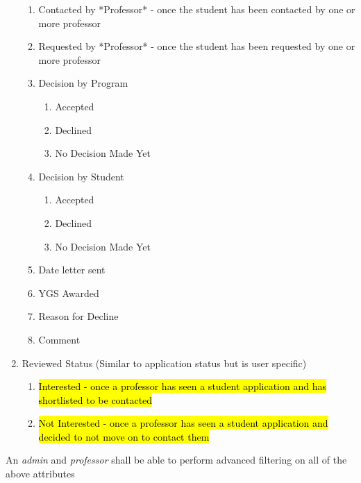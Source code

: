 \documentclass[fontsize=12pt,paper=letter,twoside]{scrartcl}
\begin{document}
\begin{mylist}
\begin{enumerate}
\begin{enumerate}
\item Contacted by *Professor* - once the student has been contacted by one or more professor
\item Requested by *Professor* - once the student has been requested by one or more professor
\item Decision by Program
\begin{enumerate} 
\item Accepted
\item Declined
\item No Decision Made Yet
\end{enumerate}
\item Decision by Student
\begin{enumerate}
\item Accepted
\item Declined
\item No Decision Made Yet
\end{enumerate}
\item Date letter sent
\item YGS Awarded
\item Reason for Decline
\item Comment
\end{enumerate}
\item Reviewed Status (Similar to application status but is user specific)
\begin{enumerate}
\item \hl{Interested - once a professor has seen a student application and has shortlisted to be contacted}
\item \hl{Not Interested - once a professor has seen a student application and decided to not move on to contact them}
\end{enumerate}
\end{enumerate}
\item An \emph{admin} and \emph{professor} shall be able to perform advanced filtering on all of the above attributes
\end{mylist}
\end{document}
